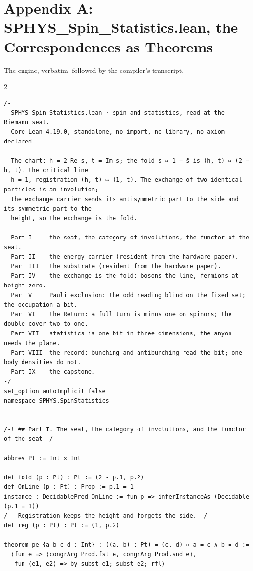 \documentclass[10pt]{article}
\begin{document}
\hypertarget{appendix-a-sphys_spin_statistics.lean-the-correspondences-as-theorems}{%
\section{Appendix A: SPHYS\_Spin\_Statistics.lean, the Correspondences
as
Theorems}\label{appendix-a-sphys_spin_statistics.lean-the-correspondences-as-theorems}}

The engine, verbatim, followed by the compiler's transcript.

\begin{multicols}{2}
\begin{Verbatim}[fontsize=\fontsize{6.0}{6.9}\selectfont,breaklines,breakanywhere,breaksymbolleft={}]
/-
  SPHYS_Spin_Statistics.lean · spin and statistics, read at the Riemann seat.
  Core Lean 4.19.0, standalone, no import, no library, no axiom declared.

  The chart: h = 2 Re s, t = Im s; the fold s ↦ 1 − s̄ is (h, t) ↦ (2 − h, t), the critical line
  h = 1, registration (h, t) ↦ (1, t). The exchange of two identical particles is an involution;
  the exchange carrier sends its antisymmetric part to the side and its symmetric part to the
  height, so the exchange is the fold.

  Part I     the seat, the category of involutions, the functor of the seat.
  Part II    the energy carrier (resident from the hardware paper).
  Part III   the substrate (resident from the hardware paper).
  Part IV    the exchange is the fold: bosons the line, fermions at height zero.
  Part V     Pauli exclusion: the odd reading blind on the fixed set; the occupation a bit.
  Part VI    the Return: a full turn is minus one on spinors; the double cover two to one.
  Part VII   statistics is one bit in three dimensions; the anyon needs the plane.
  Part VIII  the record: bunching and antibunching read the bit; one-body densities do not.
  Part IX    the capstone.
-/
set_option autoImplicit false
namespace SPHYS.SpinStatistics


/-! ## Part I. The seat, the category of involutions, and the functor of the seat -/

abbrev Pt := Int × Int

def fold (p : Pt) : Pt := (2 - p.1, p.2)
def OnLine (p : Pt) : Prop := p.1 = 1
instance : DecidablePred OnLine := fun p => inferInstanceAs (Decidable (p.1 = 1))
/-- Registration keeps the height and forgets the side. -/
def reg (p : Pt) : Pt := (1, p.2)

theorem pe {a b c d : Int} : ((a, b) : Pt) = (c, d) ↔ a = c ∧ b = d :=
  ⟨fun e => ⟨congrArg Prod.fst e, congrArg Prod.snd e⟩,
   fun ⟨e1, e2⟩ => by subst e1; subst e2; rfl⟩


\end{Verbatim}
\end{multicols}
\end{document}
